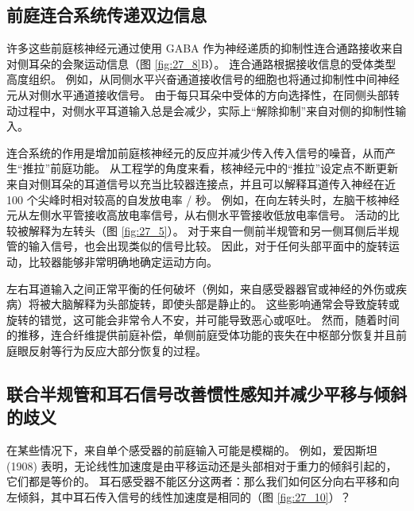 \subsection{前庭连合系统传递双边信息}
许多这些前庭核神经元通过使用 GABA 作为神经递质的抑制性连合通路接收来自对侧耳朵的会聚运动信息（图 \ref{fig:27_8}B）。 连合通路根据接收信息的受体类型高度组织。 例如，从同侧水平兴奋通道接收信号的细胞也将通过抑制性中间神经元从对侧水平通道接收信号。 由于每只耳朵中受体的方向选择性，在同侧头部转动过程中，对侧水平耳道输入总是会减少，实际上“解除抑制”来自对侧的抑制性输入。

连合系统的作用是增加前庭核神经元的反应并减少传入传入信号的噪音，从而产生“推拉”前庭功能。 从工程学的角度来看，核神经元中的“推拉”设定点不断更新来自对侧耳朵的耳道信号以充当比较器连接点，并且可以解释耳道传入神经在近 100 个尖峰时相对较高的自发放电率 / 秒。 例如，在向左转头时，左脑干核神经元从左侧水平管接收高放电率信号，从右侧水平管接收低放电率信号。 活动的比较被解释为左转头（图 \ref{fig:27_5}）。 对于来自一侧前半规管和另一侧耳侧后半规管的输入信号，也会出现类似的信号比较。 因此，对于任何头部平面中的旋转运动，比较器能够非常明确地确定运动方向。

左右耳道输入之间正常平衡的任何破坏（例如，来自感受器器官或神经的外伤或疾病）将被大脑解释为头部旋转，即使头部是静止的。 这些影响通常会导致旋转或旋转的错觉，这可能会非常令人不安，并可能导致恶心或呕吐。 然而，随着时间的推移，连合纤维提供前庭补偿，单侧前庭受体功能的丧失在中枢部分恢复并且前庭眼反射等行为反应大部分恢复的过程。


\subsection{联合半规管和耳石信号改善惯性感知并减少平移与倾斜的歧义}
在某些情况下，来自单个感受器的前庭输入可能是模糊的。 例如，爱因斯坦 (1908) 表明，无论线性加速度是由平移运动还是头部相对于重力的倾斜引起的，它们都是等价的。 
耳石感受器不能区分这两者：那么我们如何区分向右平移和向左倾斜，其中耳石传入信号的线性加速度是相同的（图 \ref{fig:27_10}）？

